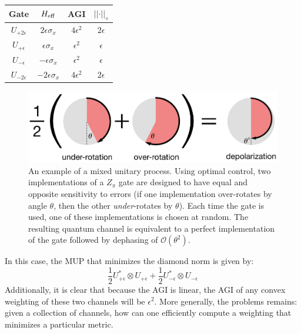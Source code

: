 \documentclass[aps,nofootinbib,pra,notitlepage,twocolumn]{revtex4-1}
\newcommand{\order}[1]{\mathcal{O}\left( #1 \right)}
\begin{document}
\begin{center}

\begin{tabular}{cccc}
	Gate & $H_{\rm{eff}}$ & AGI & $\vert\vert\cdot\vert\vert_\diamond$ \\
\hline
	$U_{+2\epsilon}$ & $2\epsilon \sigma_x$ & $4\epsilon^2$ & $2\epsilon$\\
	$U_{+\epsilon}$ & $\epsilon \sigma_x$ & $\epsilon^2$ & $\epsilon$ \\
	$U_{-\epsilon}$ & $-\epsilon \sigma_x$ & $\epsilon^2$ & $\epsilon$ \\
	$U_{-2\epsilon}$ & $-2\epsilon \sigma_x$ & $4\epsilon^2$ & $2\epsilon$ 
\end{tabular}

\end{center}

\begin{figure}
  \centering
  \includegraphics[width=\columnwidth]{simple_example.pdf}
  \caption{An example of a mixed unitary process. Using optimal control, two implementations of a $Z_\pi$ gate are designed to have equal and opposite sensitivity to errors (if one implementation over-rotates by angle $\theta$, then the other \emph{under}-rotates by $\theta$). Each time the gate is used, one of these implementations is chosen at random. The resulting quantum channel is equivalent to a perfect implementation of the gate followed by dephasing of $\order{\theta^2}$.}
  \label{fig:simple_example}
\end{figure}

In this case, the MUP that minimizes the diamond norm is given by:
\begin{equation}
\frac{1}{2}U_{+\epsilon}^*\otimes U_{+\epsilon} + \frac{1}{2}U_{-\epsilon}^*\otimes U_{-\epsilon}
\end{equation}
Additionally, it is clear that because the AGI is linear, the AGI of any convex weighting of these two channels will be $\epsilon^2$. More generally, the problems remains: given a collection of channels, how can one efficiently compute a weighting that minimizes a particular metric.
\end{document}
